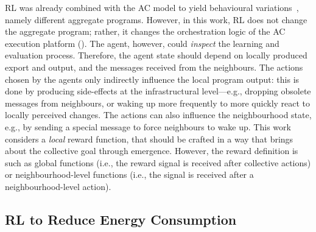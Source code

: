\ac{RL} was already combined with the \ac{AC} model 
 to yield behavioural variations~\cite{DBLP:conf/acsos/Aguzzi21}, namely different aggregate programs.
%
However, in this work, \ac{RL} does not change the aggregate program; 
 rather, it changes the orchestration logic of the \ac{AC} execution platform (). 
%
The agent, however, could \emph{inspect} the learning and evaluation process. 
 Therefore, the agent state should depend on locally produced export and output, 
 and the messages received from the neighbours.
%
The actions chosen by the agents only indirectly influence the local program output: 
 this is done by producing side-effects at the infrastructural level---e.g., 
 dropping obsolete messages from neighbours, 
 or waking up more frequently to more quickly 
 react to locally perceived changes.
%
The actions can also influence the neighbourhood state, e.g., by sending a special message to force neighbours to wake up.
%
This work considers a \emph{local} reward function, that should be crafted in a way that brings about the collective goal through emergence. 
%
However, the reward definition is   
such as global functions (i.e., the reward signal is received after collective actions) or neighbourhood-level functions (i.e., the signal is received after a neighbourhood-level action).

\subsection{\acl{RL} to Reduce Energy Consumption}\label{acsos2022:acrl-energy-goal}


